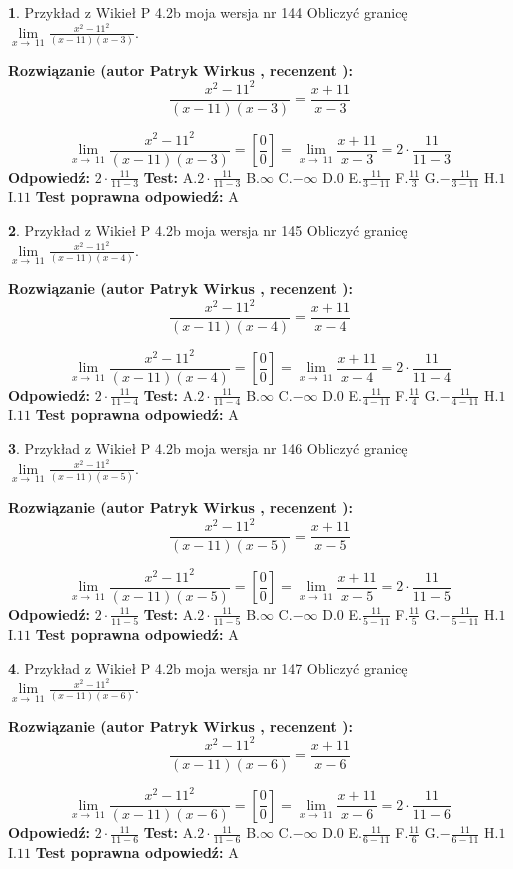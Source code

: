 \documentclass[12pt, a4paper]{article}
\theoremstyle{definition} %
\newtheorem{zad}{}
\newcommand{\zadStart}[1]{\begin{zad}#1\newline}
\newcommand{\zadStop}{\end{zad}}
\newcommand{\rozwStart}[2]{\noindent \textbf{Rozwiązanie (autor #1 , recenzent #2): }\newline}
\newcommand{\rozwStop}{\newline}
\newcommand{\odpStart}{\noindent \textbf{Odpowiedź:}\newline}
\newcommand{\odpStop}{\newline}
\newcommand{\testStart}{\noindent \textbf{Test:}\newline}
\newcommand{\testStop}{\newline}
\newcommand{\kluczStart}{\noindent \textbf{Test poprawna odpowiedź:}\newline}
\newcommand{\kluczStop}{\newline}
\begin{document}
\zadStart{Przykład z Wikieł P 4.2b moja wersja nr 144}
Obliczyć granicę $\lim\limits_{x\to\ 11}\frac{x^{2}-11^{2}}{(x-11)(x-3)}$.
\zadStop
\rozwStart{Patryk Wirkus}{}
$$\frac{x^{2}-11^{2}}{(x-11)(x-3)}=\frac{x+11}{x-3}$$

$$\lim\limits_{x\to\ 11}\frac{x^{2}-11^{2}}{(x-11)(x-3)}=[\frac{0}{0}]=\lim\limits_{x\to\ 11}\frac{x+11}{x-3}=2 \cdot \frac{11}{11-3}$$
\rozwStop
\odpStart
$2 \cdot \frac{11}{11-3}$
\odpStop
\testStart
A.$2 \cdot \frac{11}{11-3}$
B.$\infty$
C.$-\infty$
D.$0$
E.$\frac{11}{3-11}$
F.$\frac{11}{3}$
G.$-\frac{11}{3-11}$
H.$1$
I.$11$
\testStop
\kluczStart
A
\kluczStop



\zadStart{Przykład z Wikieł P 4.2b moja wersja nr 145}
Obliczyć granicę $\lim\limits_{x\to\ 11}\frac{x^{2}-11^{2}}{(x-11)(x-4)}$.
\zadStop
\rozwStart{Patryk Wirkus}{}
$$\frac{x^{2}-11^{2}}{(x-11)(x-4)}=\frac{x+11}{x-4}$$

$$\lim\limits_{x\to\ 11}\frac{x^{2}-11^{2}}{(x-11)(x-4)}=[\frac{0}{0}]=\lim\limits_{x\to\ 11}\frac{x+11}{x-4}=2 \cdot \frac{11}{11-4}$$
\rozwStop
\odpStart
$2 \cdot \frac{11}{11-4}$
\odpStop
\testStart
A.$2 \cdot \frac{11}{11-4}$
B.$\infty$
C.$-\infty$
D.$0$
E.$\frac{11}{4-11}$
F.$\frac{11}{4}$
G.$-\frac{11}{4-11}$
H.$1$
I.$11$
\testStop
\kluczStart
A
\kluczStop



\zadStart{Przykład z Wikieł P 4.2b moja wersja nr 146}
Obliczyć granicę $\lim\limits_{x\to\ 11}\frac{x^{2}-11^{2}}{(x-11)(x-5)}$.
\zadStop
\rozwStart{Patryk Wirkus}{}
$$\frac{x^{2}-11^{2}}{(x-11)(x-5)}=\frac{x+11}{x-5}$$

$$\lim\limits_{x\to\ 11}\frac{x^{2}-11^{2}}{(x-11)(x-5)}=[\frac{0}{0}]=\lim\limits_{x\to\ 11}\frac{x+11}{x-5}=2 \cdot \frac{11}{11-5}$$
\rozwStop
\odpStart
$2 \cdot \frac{11}{11-5}$
\odpStop
\testStart
A.$2 \cdot \frac{11}{11-5}$
B.$\infty$
C.$-\infty$
D.$0$
E.$\frac{11}{5-11}$
F.$\frac{11}{5}$
G.$-\frac{11}{5-11}$
H.$1$
I.$11$
\testStop
\kluczStart
A
\kluczStop



\zadStart{Przykład z Wikieł P 4.2b moja wersja nr 147}
Obliczyć granicę $\lim\limits_{x\to\ 11}\frac{x^{2}-11^{2}}{(x-11)(x-6)}$.
\zadStop
\rozwStart{Patryk Wirkus}{}
$$\frac{x^{2}-11^{2}}{(x-11)(x-6)}=\frac{x+11}{x-6}$$

$$\lim\limits_{x\to\ 11}\frac{x^{2}-11^{2}}{(x-11)(x-6)}=[\frac{0}{0}]=\lim\limits_{x\to\ 11}\frac{x+11}{x-6}=2 \cdot \frac{11}{11-6}$$
\rozwStop
\odpStart
$2 \cdot \frac{11}{11-6}$
\odpStop
\testStart
A.$2 \cdot \frac{11}{11-6}$
B.$\infty$
C.$-\infty$
D.$0$
E.$\frac{11}{6-11}$
F.$\frac{11}{6}$
G.$-\frac{11}{6-11}$
H.$1$
I.$11$
\testStop
\kluczStart
A
\kluczStop
\end{document}
